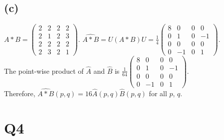 \documentclass[12pt]{article}
\begin{document}
    \subsection*{(c)} 
    $A*B = \begin{pmatrix} 2&2&2&2 \\ 2&1&2&3 \\ 2&2&2&2 \\ 2&3&2&1 \end{pmatrix}$.
    $\widehat{A*B} = U(A*B)U = \frac{1}{4} \begin{pmatrix} 8&0&0&0 \\ 0&1&0&-1 \\ 0&0&0&0 \\ 0&-1&0&1 \end{pmatrix}$.\\
    The point-wise product of $\hat{A}$ and $\hat{B}$ is $\frac{1}{64}\begin{pmatrix}
        8&0&0&0 \\ 0&1&0&-1 \\ 0&0&0&0 \\ 0&-1&0&1
    \end{pmatrix}$.\\
    Therefore, $\widehat{A*B}(p, q) = 16\hat{A}(p, q)\hat{B}(p, q)$ for all $p$, $q$.
    \section*{Q4}
\end{document}

